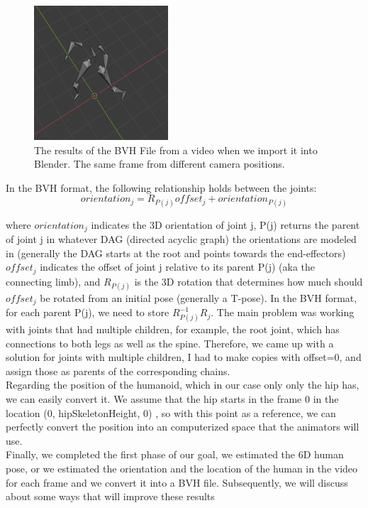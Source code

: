 \begin{figure}[htp]
    \qquad
    \includegraphics[width=5cm]{figures/Implementation/skeleton4.png}%
    \captionsetup{labelformat=empty}
    \caption{The results of the BVH File from a video when we import it into Blender. The same frame from different camera positions.}%
    \label{fig:example}%
\end{figure}

In the BVH format, the following relationship holds between the joints:
$$orientation_j=R_{P(j)}offset_j + orientation_{P(j)}$$

where $orientation_j$ indicates the 3D orientation of joint j, P(j) returns the parent of joint j in whatever DAG (directed acyclic graph) the orientations are modeled in (generally the DAG starts at the root and points towards the end-effectors) $offset_j$ indicates the offset of joint j relative to its parent P(j) (aka the connecting limb), and $R_{P(j)}$ is the 3D rotation that determines how much should $offset_j$ be rotated from an initial pose (generally a T-pose). In the BVH format, for each parent P(j), we need to store $R^{-1}_{P(j)}R_j$. The main problem was working with joints that had multiple children, for example, the root joint, which has connections to both legs as well as the spine. Therefore, we came up with a solution for joints with multiple children, I had to make copies with offset=0, and assign those as parents of the corresponding chains. \\

Regarding the position of the humanoid, which in our case only only the hip has, we can easily convert it. We assume that the hip starts in the frame 0 in the location (0, hipSkeletonHeight, 0) , so with this point as a reference, we can perfectly convert the position into an computerized space that the animators will use.\\



Finally, we completed the first phase of our goal, we estimated the 6D human pose, or we estimated the orientation and the location of the human in the video for each frame and we convert it into a BVH file. Subsequently, we will discuss about some ways that will improve these results 


